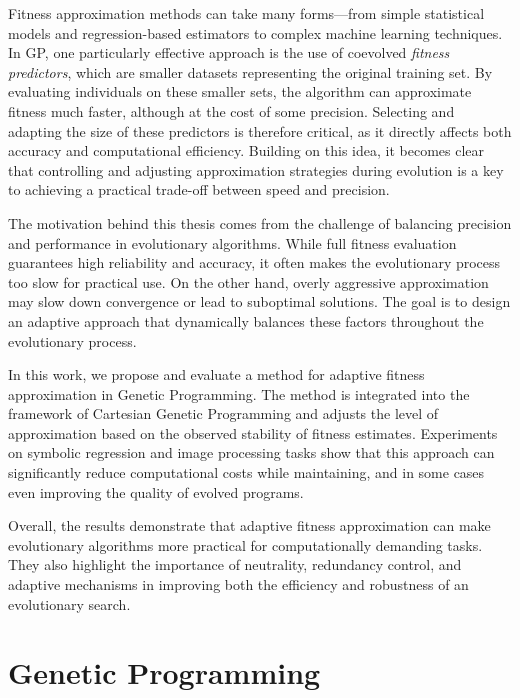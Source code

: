 \documentclass[12pt,a4paper]{report}
\begin{document}
\par Fitness approximation methods can take many forms—from simple statistical models and regression-based estimators to complex machine learning techniques. In GP, one particularly effective approach is the use of coevolved \textit{fitness predictors}, which are smaller datasets representing the original training set. By evaluating individuals on these smaller sets, the algorithm can approximate fitness much faster, although at the cost of some precision. Selecting and adapting the size of these predictors is therefore critical, as it directly affects both accuracy and computational efficiency. Building on this idea, it becomes clear that controlling and adjusting approximation strategies during evolution is a key to achieving a practical trade-off between speed and precision.

\par The motivation behind this thesis comes from the challenge of balancing precision and performance in evolutionary algorithms. While full fitness evaluation guarantees high reliability and accuracy, it often makes the evolutionary process too slow for practical use. On the other hand, overly aggressive approximation may slow down convergence or lead to suboptimal solutions. The goal is to design an adaptive approach that dynamically balances these factors throughout the evolutionary process.

\par In this work, we propose and evaluate a method for adaptive fitness approximation in Genetic Programming. The method is integrated into the framework of Cartesian Genetic Programming and adjusts the level of approximation based on the observed stability of fitness estimates. Experiments on symbolic regression and image processing tasks show that this approach can significantly reduce computational costs while maintaining, and in some cases even improving the quality of evolved programs.

\par Overall, the results demonstrate that adaptive fitness approximation can make evolutionary algorithms more practical for computationally demanding tasks. They also highlight the importance of neutrality, redundancy control, and adaptive mechanisms in improving both the efficiency and robustness of an evolutionary search.

\chapter{Genetic Programming}
\label{chap:genetic-programming}
\end{document}
